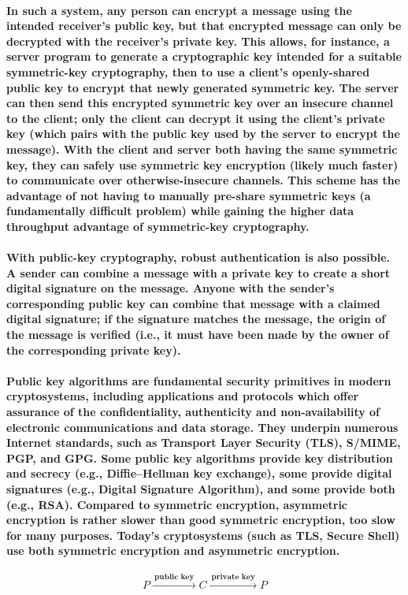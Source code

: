 \documentclass[10pt,british]{article}
\begin{document}
\paragraph{\textmd{In such a system, any person can encrypt a message using
the intended receiver's public key, but that encrypted message can
only be decrypted with the receiver's private key. This allows, for
instance, a server program to generate a cryptographic key intended
for a suitable symmetric-key cryptography, then to use a client's
openly-shared public key to encrypt that newly generated symmetric
key. The server can then send this encrypted symmetric key over an
insecure channel to the client; only the client can decrypt it using
the client's private key (which pairs with the public key used by
the server to encrypt the message). With the client and server both
having the same symmetric key, they can safely use symmetric key encryption
(likely much faster) to communicate over otherwise-insecure channels.
This scheme has the advantage of not having to manually pre-share
symmetric keys (a fundamentally difficult problem) while gaining the
higher data throughput advantage of symmetric-key cryptography.}}

\paragraph{\textmd{With public-key cryptography, robust authentication is also
possible. A sender can combine a message with a private key to create
a short digital signature on the message. Anyone with the sender's
corresponding public key can combine that message with a claimed digital
signature; if the signature matches the message, the origin of the
message is verified (i.e., it must have been made by the owner of
the corresponding private key).}}

\paragraph{\textmd{Public key algorithms are fundamental security primitives
in modern cryptosystems, including applications and protocols which
offer assurance of the confidentiality, authenticity and non-availability
of electronic communications and data storage. They underpin numerous
Internet standards, such as Transport Layer Security (TLS), S/MIME,
PGP, and GPG. Some public key algorithms provide key distribution
and secrecy (e.g., Diffie--Hellman key exchange), some provide digital
signatures (e.g., Digital Signature Algorithm), and some provide both
(e.g., RSA). Compared to symmetric encryption, asymmetric encryption
is rather slower than good symmetric encryption, too slow for many
purposes. Today's cryptosystems (such as TLS, Secure Shell) use both
symmetric encryption and asymmetric encryption.}}
\begin{center}
$$ P\xrightarrow{\:\textbf{public key}\:}C\xrightarrow{\:\textbf{private key}\:}P $$
\par\end{center}
\end{document}

